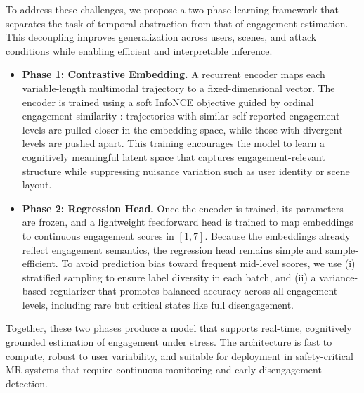 \documentclass[review]{vgtc}                 %
\begin{document}
To address these challenges, we propose a two-phase learning framework that separates the task of temporal abstraction from that of engagement estimation. This decoupling improves generalization across users, scenes, and attack conditions while enabling efficient and interpretable inference.
\begin{itemize}
    \item \textbf{Phase 1: Contrastive Embedding.} A recurrent encoder maps each variable-length multimodal trajectory to a fixed-dimensional vector. The encoder is trained using a soft InfoNCE objective guided by ordinal engagement similarity \cite{khosla2020supervised}: trajectories with similar self-reported engagement levels are pulled closer in the embedding space, while those with divergent levels are pushed apart. This training encourages the model to learn a cognitively meaningful latent space that captures engagement-relevant structure while suppressing nuisance variation such as user identity or scene layout.    
    \item \textbf{Phase 2: Regression Head.} Once the encoder is trained, its parameters are frozen, and a lightweight feedforward head is trained to map embeddings to continuous engagement scores in $[1,7]$. Because the embeddings already reflect engagement semantics, the regression head remains simple and sample-efficient. To avoid prediction bias toward frequent mid-level scores, we use (i) stratified sampling to ensure label diversity in each batch, and (ii) a variance-based regularizer that promotes balanced accuracy across all engagement levels, including rare but critical states like full disengagement.
\end{itemize}
Together, these two phases produce a model that supports real-time, cognitively grounded estimation of engagement under stress. The architecture is fast to compute, robust to user variability, and suitable for deployment in safety-critical MR systems that require continuous monitoring and early disengagement detection.

\end{document}
